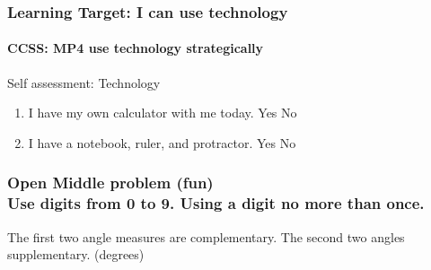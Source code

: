 \documentclass{beamer}
\begin{document}
  \frame
  {
    \frametitle{Learning Target: I can use technology}
    \framesubtitle{CCSS: MP4 use technology strategically}
  
    \begin{block}{Self assessment: Technology}
      
      \begin{enumerate}
      \item I have my own calculator with me today. Yes \qquad No
      \item I have a notebook, ruler, and protractor. Yes \qquad No
      \end{enumerate}
    \end{block}
  }

  \frame
  {
    \frametitle{Open Middle problem (fun) \\
    Use digits from 0 to 9. Using a digit no more than once.}
      The first two angle measures are complementary. The second two angles supplementary. (degrees)\\[0.75cm]
         \vspace{5cm} 
  }
\end{document}
